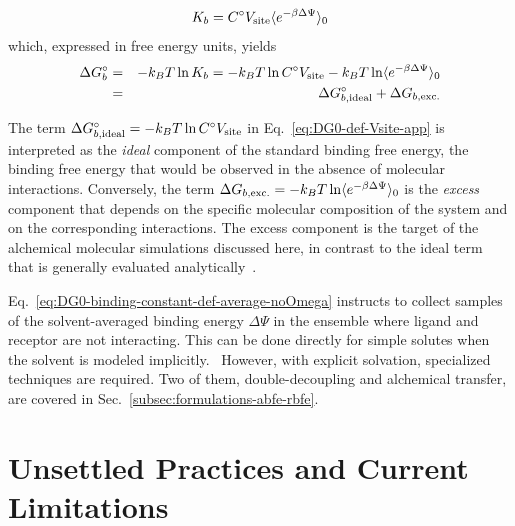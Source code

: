 \documentclass[9pt,bestpractices]{livecoms}
\begin{document}
\begin{equation}\label{eq:DG0-binding-constant-def-average-noOmega}
K_b = C^\circ V_{\rm site} \langle e^{-\beta \Delta \Psi}  \rangle_0 
\end{equation}
which, expressed in free energy units, yields
\begin{eqnarray}\label{eq:DG0-def-Vsite-app}
  \Delta G^\circ_b &=&  - k_B T \ln K_b = - k_B T \ln C^\circ V_{\rm site} - k_B T \ln \langle e^{-\beta \Delta \Psi}  \rangle_0 \nonumber \\
{\rm \ }  &=& \Delta G^\circ_{b,{\rm ideal}} + \Delta G_{b,{\rm exc.}}
\end{eqnarray}

The term $\Delta G^\circ_{b,{\rm ideal}} = - k_B T \ln C^\circ V_{\rm site}$ in Eq.~\ref{eq:DG0-def-Vsite-app} is interpreted as the \emph{ideal} component of the standard binding free energy, the binding free energy that would be observed in the absence of molecular interactions. Conversely, the term $\Delta G_{b,{\rm exc.}} = - k_B T \ln \langle e^{-\beta \Delta \Psi}  \rangle_0 $ is the \emph{excess} component that depends on the specific molecular composition of the system and on the corresponding interactions. The excess component is the target of the alchemical molecular simulations discussed here, in contrast to the ideal term that is generally evaluated analytically~\cite{boresch2003absolute}.

Eq.~\ref{eq:DG0-binding-constant-def-average-noOmega} instructs to collect samples of the solvent-averaged binding energy $\Delta \Psi$ in the ensemble where ligand and receptor are not interacting. This can be done directly for simple solutes when the solvent is modeled implicitly.~\cite{gallicchio2014virtual} However, with explicit solvation, specialized techniques are required. Two of them, double-decoupling and alchemical transfer, are covered in Sec.~\ref{subsec:formulations-abfe-rbfe}.

\section{Unsettled Practices and Current Limitations}
\label{sec:unsettled}
\end{document}
